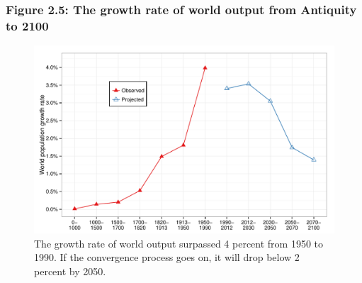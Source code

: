 \documentclass[t]{beamer}\usepackage[]{graphicx}\usepackage[]{color}
\newenvironment{knitrout}{}{} %
\begin{document}
\begin{frame}[label=Figure_2_5]
\frametitle{Figure 2.5: The growth rate of world output from Antiquity to 2100}
\begin{figure}[t]
\begin{minipage}[b]{\textwidth}
\centering
\begin{knitrout}\footnotesize
{}\color{fgcolor}

{\centering \includegraphics[width=1\linewidth]{figures/color/Figure_2_5} 

}



\end{knitrout}
\caption{The growth rate of world output surpassed 4 percent from 1950 to 1990. If the convergence process goes on, it will drop below 2 percent by 2050.}
\end{minipage}
\end{figure}
\end{frame}
\end{document}
